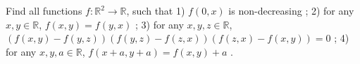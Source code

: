 Find all functions $f: \mathbb{R}^2 \rightarrow \mathbb{R}$, such that
1) $f(0,x)$ is non-decreasing ;
2) for any $x,y \in \mathbb{R}$, $f(x,y)=f(y,x)$ ;
3) for any $x,y,z \in \mathbb{R}$, $(f(x,y)-f(y,z))(f(y,z)-f(z,x))(f(z,x)-f(x,y))=0$ ;
4) for any $x,y,a \in \mathbb{R}$, $f(x+a,y+a)=f(x,y)+a$ .
